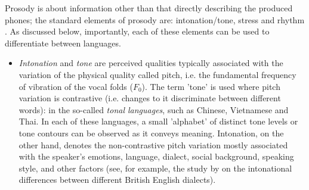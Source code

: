 \documentclass[bsc,frontabs,twoside,singlespacing,parskip,deptreport]{infthesis}
\begin{document}
{{{      %
      Prosody is about information other than that directly describing the produced phones; the standard elements of prosody are: intonation/tone, stress and rhythm \citep{Prieto_et_al_2018}. As discussed below, importantly, each of these elements can be used to differentiate between languages.
      \begin{itemize}
        \item {\textit{Intonation} and \textit{tone} are perceived qualities typically associated with the variation of the physical quality called pitch, i.e. the fundamental frequency of vibration of the vocal folds ($F_0$). The term 'tone' is used where pitch variation is contrastive (i.e. changes to it discriminate between different words): in the so-called \textit{tonal languages}, such as Chinese, Vietnamese and Thai. In each of these languages, a small 'alphabet' of distinct tone levels or tone contours can be observed as it conveys meaning. Intonation, on the other hand, denotes the non-contrastive pitch variation mostly associated with the speaker's emotions, language, dialect, social background, speaking style, and other factors (see, for example, the study by \citet{Grabe_2004} on the intonational differences between different British English dialects).}

\end{itemize}}}}
\end{document}
